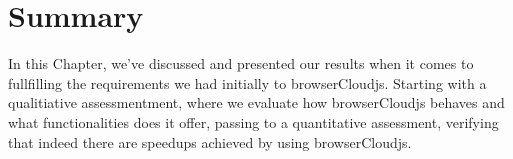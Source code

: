 \section{Summary}

In this Chapter, we've discussed and presented our results when it comes to fullfilling the requirements we had initially to browserCloudjs. Starting with a qualitiative assessmentment, where we evaluate how browserCloudjs behaves and what functionalities does it offer, passing to a quantitative assessment, verifying that indeed there are speedups achieved by using browserCloudjs.
